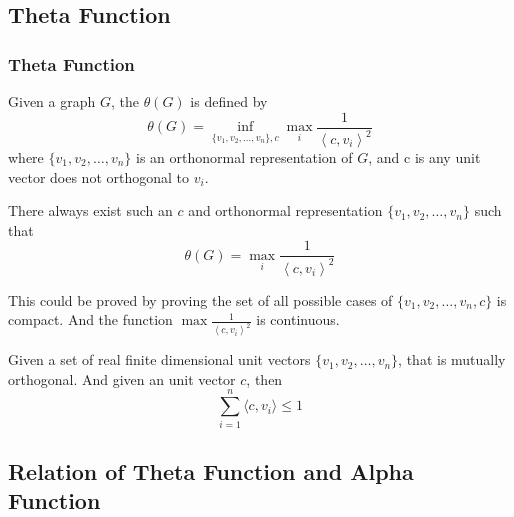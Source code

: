 \subsection{Theta Function}

      \begin{frame}
            \frametitle{Theta Function}
            Given a graph $ G $, the $ \theta(G) $ is defined by
            \begin{equation}
                  \theta(G) = \inf_{\{v_1, v_2, \dots, v_n\},c} \max_{i} \frac{1}{\left<c,v_{i}\right>^2}
            \end{equation}
            where $ \{v_1, v_2, \dots, v_n\} $ is an orthonormal representation of $ G $, and c is any unit vector does not orthogonal to $ v_i $.

            \pause

            \begin{lemma}
                  There always exist such an $c$ and orthonormal representation $ \{v_1, v_2, \dots, v_n\} $ such that
                  \begin{equation}
                        \theta(G) = \max_{i} \frac{1}{\left<c,v_{i}\right>^2}
                  \end{equation}
            \end{lemma}

            This could be proved by proving the set of all possible cases of $ \{v_1, v_2, \dots, v_n,c \} $ is compact. And the function $ \max \frac{1}{\left<c,v_{i}\right>^2} $ is continuous.
      \end{frame}

      \begin{frame}
            \begin{lemma}
                  Given a set of real finite dimensional unit vectors $\{v_{1},v_{2},\hdots,v_{n}\}$, that is mutually orthogonal.
                  And given an unit vector $c$, then
                  \begin{equation}
                        \sum_{i=1}^{n} \langle c, v_{i} \rangle \le 1
                  \end{equation}
            \end{lemma}
      \end{frame}

\subsection*{Relation of Theta Function and Alpha Function}


